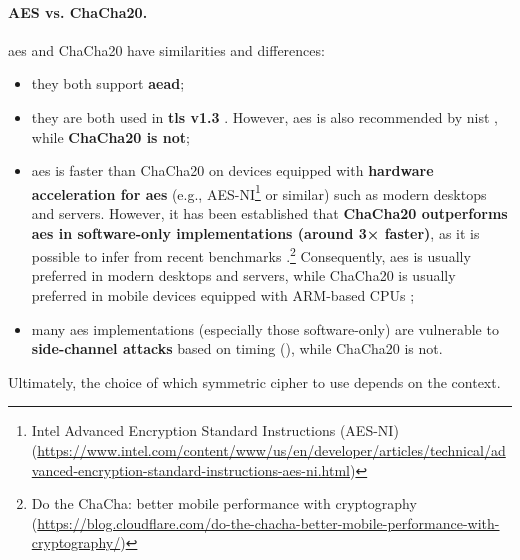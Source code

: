 \paragraph*{AES vs. ChaCha20.} \gls{aes} and ChaCha20 have similarities and differences:
\begin{itemize}
	\item they both support \textbf{\gls{aead}};
	\item they are both used in \textbf{\gls{tls} v1.3} \cite{rfc8446}. 
	However, \gls{aes} is also recommended by \gls{nist} \cite{barker_recommendation_2020_p1}, while \textbf{ChaCha20 is not};
	\item \gls{aes} is faster than ChaCha20 on devices equipped with \textbf{hardware acceleration for \gls{aes}} (e.g., AES-NI\footnote{Intel Advanced Encryption Standard Instructions (AES-NI) (\url{https://www.intel.com/content/www/us/en/developer/articles/technical/advanced-encryption-standard-instructions-aes-ni.html})} or similar) such as modern desktops and servers. However, it has been established that \textbf{ChaCha20 outperforms \gls{aes} in software-only implementations (around 3× faster)}, as it is possible to infer from recent benchmarks \cite{heiko_benchmarking_2024}.\footnote{Do the ChaCha: better mobile performance with cryptography (\url{https://blog.cloudflare.com/do-the-chacha-better-mobile-performance-with-cryptography/})} Consequently, \gls{aes} is usually preferred in modern desktops and servers, while ChaCha20 is usually preferred in mobile devices equipped with ARM-based CPUs \cite{rfc8439};
	\item many \gls{aes} implementations (especially those software-only) are vulnerable to \textbf{side-channel attacks} based on timing (), while ChaCha20 is not.
\end{itemize}

Ultimately, the choice of which symmetric cipher to use depends on the context.

